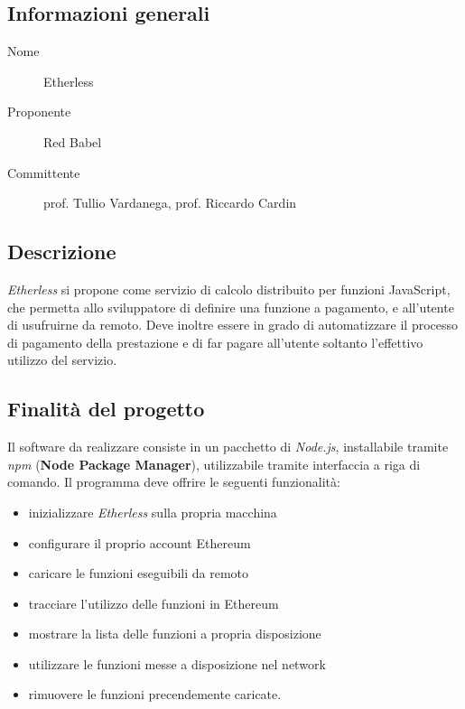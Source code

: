 \documentclass[../studio-di-fattibilita.tex]{subfiles}
\begin{document}
  \subsection{Informazioni generali}%
  \label{subsec:informazioni_generali}
  \begin{description}
    \item[Nome] Etherless
    \item[Proponente] Red Babel
    \item[Committente] prof. Tullio Vardanega, prof. Riccardo Cardin
  \end{description}
  \subsection{Descrizione}%
  \label{subsec:descrizione}
  \textit{Etherless} si propone come servizio di calcolo distribuito per funzioni JavaScript, che permetta allo sviluppatore di definire una funzione a pagamento, e all'utente di usufruirne da remoto. Deve inoltre essere in grado di automatizzare il processo di pagamento della prestazione e di far pagare all'utente soltanto l'effettivo utilizzo del servizio.
  \subsection{Finalità del progetto}%
  \label{subsec:finalita_del_progetto}
  Il software da realizzare consiste in un pacchetto di \textit{Node.js}, installabile tramite \textit{npm} (\textbf{Node Package Manager}), utilizzabile tramite interfaccia a riga di comando.
  Il programma deve offrire le seguenti funzionalità:
  \begin{itemize}
    \item inizializzare \textit{Etherless} sulla propria macchina
    \item configurare il proprio account Ethereum
    \item caricare le funzioni  eseguibili da remoto
    \item tracciare l'utilizzo delle funzioni in Ethereum
    \item mostrare la lista delle funzioni a propria disposizione
    \item utilizzare le funzioni messe a disposizione nel network
    \item rimuovere le funzioni precendemente caricate.
  \end{itemize}
\end{document}
